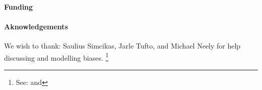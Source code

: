 \maketitle
\begin{abstract}
  
\end{abstract}
\paragraph{Funding}
\paragraph{Aknowledgements}
We wish to thank:
Saulius Simcikas, Jarle Tufto, and Michael Neely
for help discussing and modelling biases.
\footnote{See:
   and
  }
\clearpage